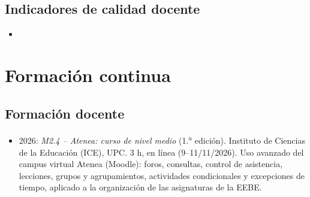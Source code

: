 \documentclass[11pt]{article}
\begin{document}
\subsection{Indicadores de calidad docente}
\begin{itemize}
  \item {} 
\end{itemize}

\section{Formaci\'on continua}
\subsection{Formaci\'on docente}
\begin{itemize}
  \item 2026: \emph{M2.4 -- Atenea: curso de nivel medio} (1.\textsuperscript{a} edici\'on).
  Instituto de Ciencias de la Educaci\'on (ICE), UPC. 3 h, en l\'inea (9--11/11/2026).
  Uso avanzado del campus virtual Atenea (Moodle): foros, consultas, control de asistencia,
  lecciones, grupos y agrupamientos, actividades condicionales y excepciones de tiempo, aplicado
  a la organizaci\'on de las asignaturas de la EEBE. 
\end{itemize}
\end{document}
